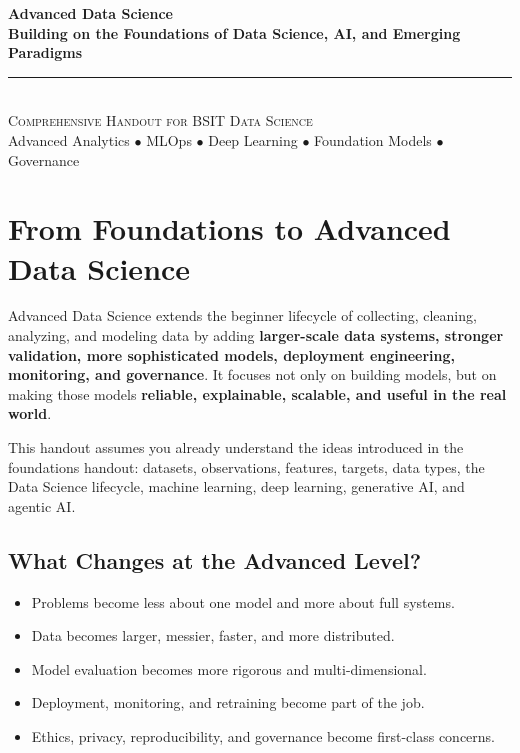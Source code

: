 \documentclass[11pt,a4paper]{article}
\begin{document}
\begin{center}
\vspace*{0.5cm}
{\Huge\bfseries\textcolor{primary}{Advanced Data Science}}\\[8pt]
{\Huge\bfseries\textcolor{primary}{Building on the Foundations of Data Science, AI, and Emerging Paradigms}}\\[16pt]
{\color{secondary}\rule{0.85\textwidth}{1.5pt}}\\[14pt]
{\Large\textsc{Comprehensive Handout for BSIT Data Science}}\\[8pt]
{\large\textcolor{gray!70!black}{Advanced Analytics $\bullet$ MLOps $\bullet$ Deep Learning $\bullet$ Foundation Models $\bullet$ Governance}}
\vspace{0.3cm}
\end{center}

\tableofcontents
\newpage

\section{From Foundations to Advanced Data Science}

\begin{definitionbox}
Advanced Data Science extends the beginner lifecycle of collecting, cleaning, analyzing, and modeling data by adding \textbf{larger-scale data systems, stronger validation, more sophisticated models, deployment engineering, monitoring, and governance}. It focuses not only on building models, but on making those models \textbf{reliable, explainable, scalable, and useful in the real world}.
\end{definitionbox}

\begin{conceptbox}
This handout assumes you already understand the ideas introduced in the foundations handout: datasets, observations, features, targets, data types, the Data Science lifecycle, machine learning, deep learning, generative AI, and agentic AI.
\end{conceptbox}

\subsection{What Changes at the Advanced Level?}

\begin{itemize}[leftmargin=*]
  \item Problems become less about one model and more about full systems.
  \item Data becomes larger, messier, faster, and more distributed.
  \item Model evaluation becomes more rigorous and multi-dimensional.
  \item Deployment, monitoring, and retraining become part of the job.
  \item Ethics, privacy, reproducibility, and governance become first-class concerns.
\end{itemize}
\end{document}

